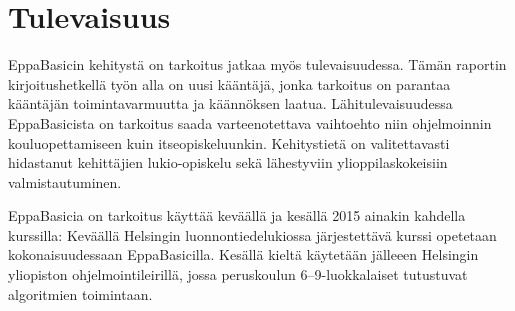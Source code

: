 \section{Tulevaisuus}
EppaBasicin kehitystä on tarkoitus
jatkaa myös tulevaisuudessa.
Tämän raportin kirjoitushetkellä työn alla
on uusi kääntäjä,
jonka tarkoitus on parantaa kääntäjän
toimintavarmuutta ja käännöksen laatua.
Lähitulevaisuudessa EppaBasicista on tarkoitus
saada varteenotettava vaihtoehto niin ohjelmoinnin
kouluopettamiseen kuin itseopiskeluunkin.
Kehitystietä on valitettavasti hidastanut kehittäjien
lukio-opiskelu sekä lähestyviin ylioppilaskokeisiin
valmistautuminen.

EppaBasicia on tarkoitus käyttää keväällä
ja kesällä 2015 ainakin kahdella kurssilla:
Keväällä Helsingin luonnontiedelukiossa
järjestettävä kurssi opetetaan kokonaisuudessaan
EppaBasicilla.
Kesällä kieltä käytetään jälleeen
Helsingin yliopiston
ohjelmointileirillä, jossa peruskoulun
6--9-luokkalaiset tutustuvat
algoritmien toimintaan.